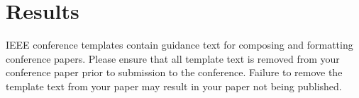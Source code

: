 \documentclass[conference]{IEEEtran}
\begin{document}
\section{Results}




\vspace{12pt}
\color{red}
IEEE conference templates contain guidance text for composing and formatting conference papers. Please ensure that all template text is removed from your conference paper prior to submission to the conference. Failure to remove the template text from your paper may result in your paper not being published.
\end{document}
